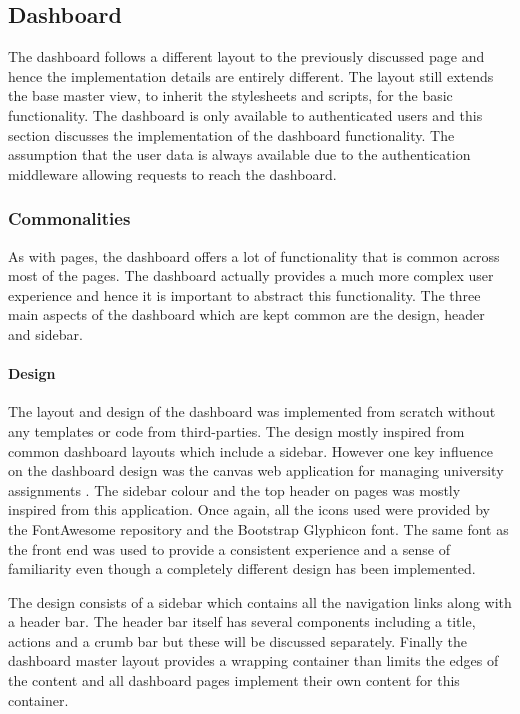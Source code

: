 \subsection{Dashboard}
The dashboard follows a different layout to the previously discussed page and hence the implementation details are entirely different. The layout still extends the base master view, to inherit the stylesheets and scripts, for the basic functionality. The dashboard is only available to authenticated users and this section discusses the implementation of the dashboard functionality. The assumption that the user data is always available due to the authentication middleware allowing requests to reach the dashboard.

\subsubsection{Commonalities}
As with pages, the dashboard offers a lot of functionality that is common across most of the pages. The dashboard actually provides a much more complex user experience and hence it is important to abstract this functionality. The three main aspects of the dashboard which are kept common are the design, header and sidebar.

\paragraph{Design}
The layout and design of the dashboard was implemented from scratch without any templates or code from third-parties. The design mostly inspired from common dashboard layouts which include a sidebar. However one key influence on the dashboard design was the canvas web application for managing university assignments \cite{Canvas:Home}. The sidebar colour and the top header on pages was mostly inspired from this application. Once again, all the icons used were provided by the FontAwesome repository and the Bootstrap Glyphicon font. The same font as the front end was used to provide a consistent experience and a sense of familiarity even though a completely different design has been implemented.

The design consists of a sidebar which contains all the navigation links along with a header bar. The header bar itself has several components including a title, actions and a crumb bar but these will be discussed separately. Finally the dashboard master layout provides a wrapping container than limits the edges of the content and all dashboard pages implement their own content for this container.

